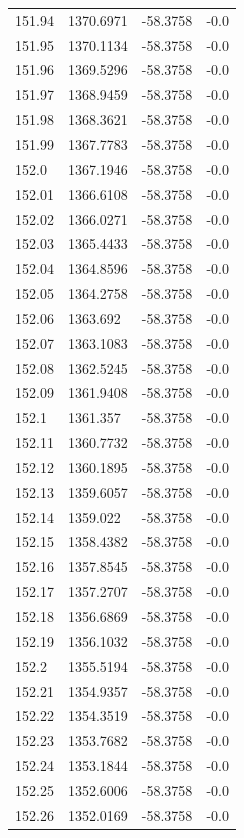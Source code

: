 \begin{table}[H]
\begin{tabular}{llll}
151.94 & 1370.6971 & -58.3758 & -0.0 \\
151.95 & 1370.1134 & -58.3758 & -0.0 \\
151.96 & 1369.5296 & -58.3758 & -0.0 \\
151.97 & 1368.9459 & -58.3758 & -0.0 \\
151.98 & 1368.3621 & -58.3758 & -0.0 \\
151.99 & 1367.7783 & -58.3758 & -0.0 \\
152.0 & 1367.1946 & -58.3758 & -0.0 \\
152.01 & 1366.6108 & -58.3758 & -0.0 \\
152.02 & 1366.0271 & -58.3758 & -0.0 \\
152.03 & 1365.4433 & -58.3758 & -0.0 \\
152.04 & 1364.8596 & -58.3758 & -0.0 \\
152.05 & 1364.2758 & -58.3758 & -0.0 \\
152.06 & 1363.692 & -58.3758 & -0.0 \\
152.07 & 1363.1083 & -58.3758 & -0.0 \\
152.08 & 1362.5245 & -58.3758 & -0.0 \\
152.09 & 1361.9408 & -58.3758 & -0.0 \\
152.1 & 1361.357 & -58.3758 & -0.0 \\
152.11 & 1360.7732 & -58.3758 & -0.0 \\
152.12 & 1360.1895 & -58.3758 & -0.0 \\
152.13 & 1359.6057 & -58.3758 & -0.0 \\
152.14 & 1359.022 & -58.3758 & -0.0 \\
152.15 & 1358.4382 & -58.3758 & -0.0 \\
152.16 & 1357.8545 & -58.3758 & -0.0 \\
152.17 & 1357.2707 & -58.3758 & -0.0 \\
152.18 & 1356.6869 & -58.3758 & -0.0 \\
152.19 & 1356.1032 & -58.3758 & -0.0 \\
152.2 & 1355.5194 & -58.3758 & -0.0 \\
152.21 & 1354.9357 & -58.3758 & -0.0 \\
152.22 & 1354.3519 & -58.3758 & -0.0 \\
152.23 & 1353.7682 & -58.3758 & -0.0 \\
152.24 & 1353.1844 & -58.3758 & -0.0 \\
152.25 & 1352.6006 & -58.3758 & -0.0 \\
152.26 & 1352.0169 & -58.3758 & -0.0 \\

\end{tabular}
\end{table}
